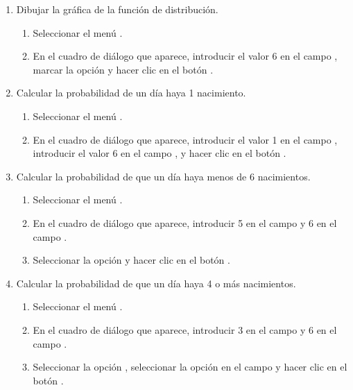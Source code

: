 \begin{enumerate}[leftmargin=*]
\begin{enumerate}
\item Dibujar la gráfica de la función de distribución.
\begin{indicacion}{
\begin{enumerate}
\item Seleccionar el menú .
\item En el cuadro de diálogo que aparece, introducir el valor 6 en el campo , marcar la opción
 y hacer clic en el botón .
\end{enumerate}}
\end{indicacion}

\item Calcular la probabilidad de un día haya 1 nacimiento.
\begin{indicacion}{
\begin{enumerate}
\item Seleccionar el menú .
\item En el cuadro de diálogo que aparece, introducir el valor 1 en el campo , introducir
el valor 6 en el campo , y hacer clic en el botón .
\end{enumerate}}
\end{indicacion}

\item Calcular la probabilidad de que un día haya menos de 6 nacimientos.
\begin{indicacion}{
\begin{enumerate}
\item Seleccionar el menú .
\item En el cuadro de diálogo que aparece, introducir 5 en el campo  y 6 en el campo
.
\item Seleccionar la opción  y hacer clic en el botón .
\end{enumerate}}
\end{indicacion}

\item Calcular la probabilidad de que un día haya 4 o más nacimientos. 
\begin{indicacion}{
\begin{enumerate}
\item Seleccionar el menú .
\item En el cuadro de diálogo que aparece, introducir 3 en el campo  y 6 en el campo
. 
\item Seleccionar la opción , seleccionar la opción  en el campo
 y hacer clic en el botón .
\end{enumerate}}
\end{indicacion}


\end{enumerate}
\end{enumerate}
